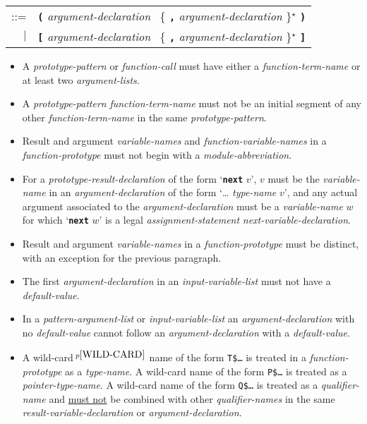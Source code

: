 \documentclass[12pt]{article}
\newcommand{\TT}[1]{{\tt \bfseries #1}}
\newcommand{\STAR}{{\Large $^\star$}}
\newcommand{\pagnote}[1]{$\,^{p\pageref{#1}}$}
\newenvironment{indpar}[1][0.3in]%
	{\begin{list}{}%
		     {\setlength{\itemsep}{0in}%
		      \setlength{\topsep}{0in}%
		      \setlength{\parsep}{1ex}%
		      \setlength{\labelwidth}{#1}%
		      \setlength{\leftmargin}{#1}%
		      \addtolength{\leftmargin}{\labelsep}}%
	 \item}%
	{\end{list}}
\begin{document}
\begin{indpar}
\hspace*{1in}
    \begin{tabular}[t]{@{}rl}
    ::= & \TT{(} {\em argument-declaration}~
                 \{ \TT{,} {\em argument-declaration} \}\STAR{} \TT{)} \\
    $|$ & \TT{[} {\em argument-declaration}~
                 \{ \TT{,} {\em argument-declaration} \}\STAR{} \TT{]} \\
    \end{tabular}
\begin{itemize}
\item
A {\em prototype-pattern} or {\em function-call}
must have either a {\em function-term-name}
or at least two {\em argu\-ment-lists}.
\item
A {\em prototype-pattern} {\em function-term-name} must not be
an initial segment of any other {\em function-term-name}
in the same {\em prototype-pattern}.
\item
Result and argument {\em variable-names} and {\em function-variable-names}
in a {\em function-prototype} must not begin with a {\em module-abbreviation}.
\item
For a {\em prototype-result-declaration} of the form `\TT{next} $v$',
$v$ must be the {\em vari\-able-name} in an {\em argument-declaration}
of the form `\dots{} {\em type-name} $v$', and
any actual argument associated to the {\em argument-declaration}
must be a {\em variable-name} $w$ for which `\TT{next} $w$' is a legal
{\em assignment-statement} {\em next-variable-declaration}.
\item
Result and argument {\em variable-names}
in a {\em function-prototype} must
be distinct, with an exception for the previous paragraph.
\item
The first {\em argument-declaration} in an {\em input-variable-list}
must not have a {\em default-value}.
\item
In a {\em pattern-argument-list} or {\em input-variable-list}
an {\em argument-declaration} with no {\em de\-fault-value} cannot
follow an {\em argument-declaration} with a {\em default-value}.
\item
A wild-card\pagnote{WILD-CARD} name of the form {\tt T\$\ldots}
is treated in a {\em function-prototype} as a {\em type-name}.
A wild-card name of the form {\tt P\$\ldots} is treated as a
{\em pointer-type-name}.
A wild-card name of the form {\tt Q\$\ldots} is treated as a
{\em qualifier-name} and \underline{must not} be combined with
other {\em qualifier-names} in the same {\em result-variable-declaration}
or {\em argument-declaration}.

\end{itemize}
\end{indpar}
\end{document}
